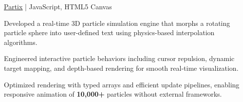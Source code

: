 \begin{cvproject}{\href{https://github.com/grvsnh/partix}{\uline{Partix}} | JavaScript, HTML5 Canvas}{}
    \item Developed a real-time 3D particle simulation engine that morphs a rotating particle sphere into user-defined text using physics-based interpolation algorithms.
    \item Engineered interactive particle behaviors including cursor repulsion, dynamic target mapping, and depth-based rendering for smooth real-time visualization.
    \item Optimized rendering with typed arrays and efficient update pipelines, enabling responsive animation of \textbf{10,000+} particles without external frameworks.
\end{cvproject}